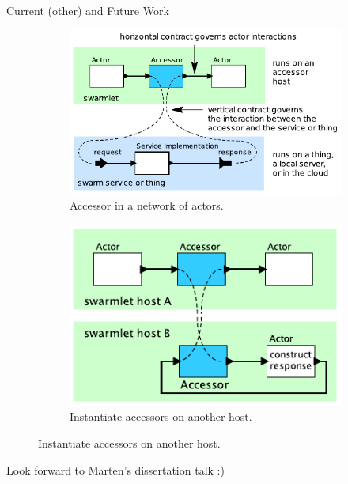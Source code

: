 \begin{frame}{Current (other) and Future Work}
  \begin{figure}
    \begin{subfigure}{0.49\textwidth}
      \centering
      \includegraphics[height=0.4\textheight]{figures/accessors.pdf}
      \caption{Accessor in a network of actors.}
    \end{subfigure}
    \hfill
    \begin{subfigure}{0.49\textwidth}
      \centering
      \includegraphics[height=0.4\textheight]{figures/accessors2.pdf}
      \caption{Instantiate accessors on another host.}
    \end{subfigure}
  \end{figure}

  \pause
  Look forward to Marten's dissertation talk :)
\end{frame}

